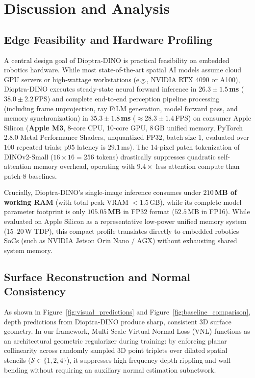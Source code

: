 \section{Discussion and Analysis}
\label{sec:discussion}

\subsection{Edge Feasibility and Hardware Profiling}
A central design goal of Dioptra-DINO is practical feasibility on embedded robotics hardware. While most state-of-the-art spatial AI models assume cloud GPU servers or high-wattage workstations (e.g., NVIDIA RTX 4090 or A100), Dioptra-DINO executes steady-state neural forward inference in \textbf{$26.3 \pm 1.5$\,ms} ($38.0 \pm 2.2$\,FPS) and complete end-to-end perception pipeline processing (including frame unprojection, ray FiLM generation, model forward pass, and memory synchronization) in \textbf{$35.3 \pm 1.8$\,ms} ($\approx \mathbf{28.3 \pm 1.4}$\,FPS) on consumer Apple Silicon (\textbf{Apple M3}, 8-core CPU, 10-core GPU, 8\,GB unified memory, PyTorch 2.8.0 Metal Performance Shaders, unquantized FP32, batch size 1, evaluated over 100 repeated trials; p95 latency is $29.1$\,ms). The 14-pixel patch tokenization of DINOv2-Small ($16 \times 16 = 256$ tokens) drastically suppresses quadratic self-attention memory overhead, operating with $9.4\times$ less attention compute than patch-8 baselines.

Crucially, Dioptra-DINO's single-image inference consumes under \textbf{$210$\,MB of working RAM} (with total peak VRAM $<1.5$\,GB), while its complete model parameter footprint is only \textbf{$105.05$\,MB} in FP32 format ($52.5$\,MB in FP16). While evaluated on Apple Silicon as a representative low-power unified memory system ($15\text{--}20$\,W TDP), this compact profile translates directly to embedded robotics SoCs (such as NVIDIA Jetson Orin Nano / AGX) without exhausting shared system memory.

\subsection{Surface Reconstruction and Normal Consistency}
As shown in Figure~\ref{fig:visual_predictions} and Figure~\ref{fig:baseline_comparison}, depth predictions from Dioptra-DINO produce sharp, consistent 3D surface geometry. In our framework, Multi-Scale Virtual Normal Loss (VNL) functions as an architectural geometric regularizer during training: by enforcing planar collinearity across randomly sampled 3D point triplets over dilated spatial stencils ($\mathcal{S} \in \{1, 2, 4\}$), it suppresses high-frequency depth rippling and wall bending without requiring an auxiliary normal estimation subnetwork.

